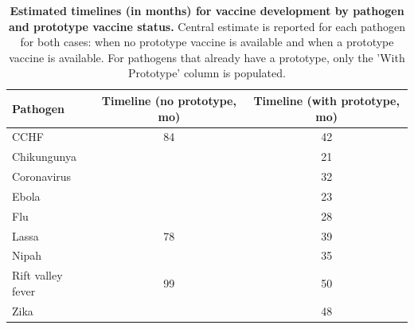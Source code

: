 \begin{table}[!htbp]
\caption{\textbf{Estimated timelines (in months) for vaccine development by pathogen and prototype vaccine status.} Central estimate is reported for each pathogen for both cases: when no prototype vaccine is available and when a prototype vaccine is available. For pathogens that already have a prototype, only the 'With Prototype' column is populated.}
\label{tab:rd-timelines}
\begin{tabular}{lcc}
\hline\hline
Pathogen & Timeline (no prototype, mo) & Timeline (with prototype, mo) \\
\hline
CCHF & 84 & 42 \\
Chikungunya &  & 21 \\
Coronavirus &  & 32 \\
Ebola &  & 23 \\
Flu &  & 28 \\
Lassa & 78 & 39 \\
Nipah &  & 35 \\
Rift valley fever & 99 & 50 \\
Zika &  & 48 \\
\hline\hline
\end{tabular}
\end{table}

